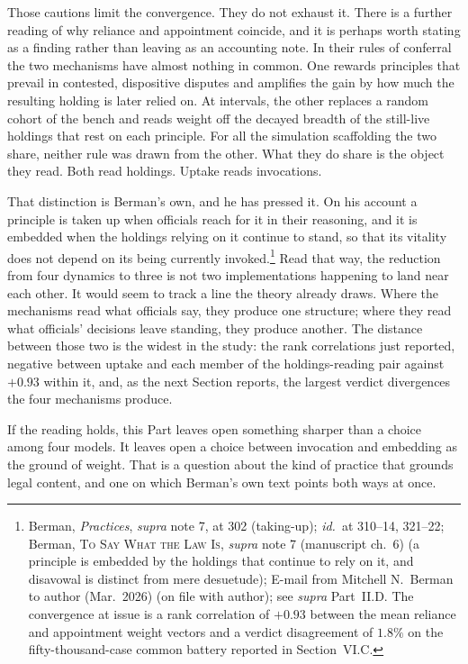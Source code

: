 Those cautions limit the convergence. They do not exhaust it. There is a
further reading of why reliance and appointment coincide, and it is perhaps
worth stating as a finding rather than leaving as an accounting note. In their rules of conferral the two mechanisms have almost nothing in common.
One rewards principles that prevail in contested, dispositive disputes and
amplifies the gain by how much the resulting holding is later relied on. At
intervals, the other replaces a random cohort of the bench and reads weight off
the decayed breadth of the still-live holdings that rest on each principle.
For all the simulation scaffolding the two share, neither rule was drawn from
the other. What they do share is the object they read. Both read holdings. Uptake
reads invocations.

That distinction is Berman's own, and he has pressed it. On his account a
principle is taken up when officials reach for it in their reasoning, and
it is embedded when the holdings relying on it continue to stand, so that
its vitality does not depend on its being currently invoked.\footnote{Berman, \textit{Practices}, \textit{supra} note 7, at
302 (taking-up); \textit{id.}\ at 310--14, 321--22; Berman, \textsc{To
Say What the Law Is}, \textit{supra} note 7 (manuscript ch.\ 6) (a
principle is embedded by the holdings that continue to rely on it, and
disavowal is distinct from mere desuetude); E-mail from Mitchell N.\
Berman to author (Mar.\ 2026) (on file with author); see \textit{supra}
Part~II.D. The convergence at issue is a rank correlation of $+0.93$
between the mean reliance and appointment weight vectors and a verdict
disagreement of $1.8\%$ on the fifty-thousand-case common battery reported
in Section~VI.C.}
Read that way, the reduction from four dynamics to three is not two
implementations happening to land near each other. It would seem to track a
line the theory already draws. Where the mechanisms read what officials say,
they produce one structure; where they read what officials' decisions leave
standing, they produce another. The distance between those two is the
widest in the study: the rank correlations just reported, negative
between uptake and each member of the holdings-reading pair against
$+0.93$ within it, and, as the next Section reports, the largest verdict
divergences the four mechanisms produce.

If the reading holds, this Part leaves open something sharper than a choice
among four models. It leaves open a choice between invocation and
embedding as the ground of weight. That is a question about the kind of
practice that grounds legal content, and one on which Berman's own text
points both ways at once.

